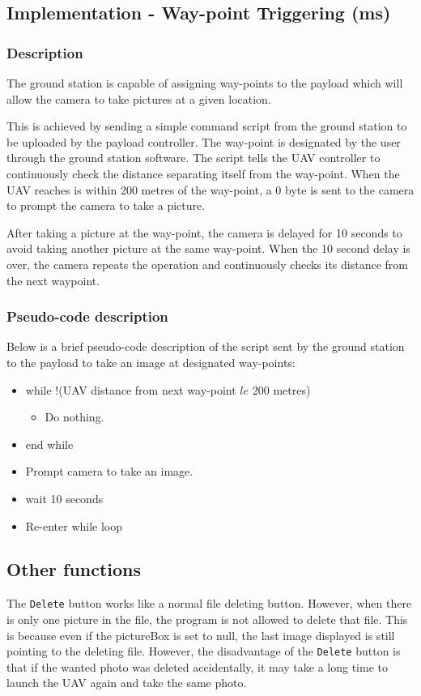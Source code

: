 \subsection{Implementation - Way-point Triggering (ms)}
\label{sec:waypoint_triggering}

\subsubsection{Description}

The ground station is capable of assigning way-points to
the payload which will allow the camera to take pictures 
at a given location.

This is achieved by sending a simple command script from
the ground station to be uploaded by the payload 
controller. The way-point is designated by the user
through the ground station software. The script 
tells the UAV controller to continuously check the
distance separating itself from the way-point.
When the UAV reaches is within 200 metres of the
way-point, a 0 byte is sent to the camera to prompt
the camera to take a picture.

After taking a picture at the way-point, the camera
is delayed for 10 seconds to avoid taking another picture
at the same way-point. When the 10 second delay is over,
the camera repeats the operation and continuously checks
its distance from the next waypoint.

\subsubsection{Pseudo-code description}

Below is a brief pseudo-code description of the script
sent by the ground station to the payload to take an
image at designated way-points:

\begin{itemize}
	\item while !(UAV distance from next way-point $le$ 200 metres)
		\begin{itemize}
			\item Do nothing.
		\end{itemize}
	\item end while
	\item Prompt camera to take an image.
	\item wait 10 seconds
	\item Re-enter while loop
\end{itemize}

\subsection{Other functions}
The \texttt{Delete} button works like a normal file deleting button. However, when there is only one picture in the file, the program is not allowed to delete that file. This is because even if the pictureBox is set to null, the last image displayed is still pointing to the deleting file. However, the disadvantage of the \texttt{Delete} button is that if the wanted photo was deleted accidentally, it may take a long time to launch the UAV again and take the same photo. 

